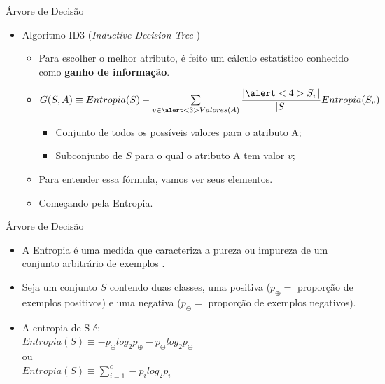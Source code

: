 \documentclass{libs/ufc_format}
\begin{document}
\begin{frame}{Árvore de Decisão}
    \begin{itemize}
        \item Algoritmo ID3 (\textit{Inductive Decision Tree} \cite{q86})
            \begin{itemize}
                \justifying
                \item Para escolher o melhor atributo, é feito um cálculo estatístico conhecido como \textbf{ganho de informação}.
                \item<2-> $G(S,A) \equiv Entropia(S) - \sum\limits_{v \in \alert<3>{Valores(A)}}\dfrac{|\alert<4>{S_{v}}|}{|S|}Entropia(S_{v})$
                    \begin{itemize}
                        \justifying
                        \item<3-4> Conjunto de todos os possíveis valores para o atributo A;
                        \item<4> Subconjunto de $S$ para o qual o atributo A tem valor $v$;
                    \end{itemize}
                \item<5-> Para entender essa fórmula, vamos ver seus elementos.
                \item<6> Começando pela Entropia.
            \end{itemize}
    \end{itemize}
\end{frame}

\begin{frame}{Árvore de Decisão}
    \begin{itemize}
        \justifying
        \item A Entropia é uma medida que caracteriza a pureza ou impureza de um conjunto arbitrário de exemplos \cite{m97}.
        \item<2-> Seja um conjunto $S$ contendo duas classes, uma positiva ($p_{\oplus} =$ proporção de exemplos positivos) e uma negativa ($p_{\ominus} =$ proporção de exemplos negativos).
        \item<3-> A entropia de S é:\\
        $Entropia(S) \equiv -p_{\oplus}log_{2}p_{\oplus} - p_{\ominus}log_{2}p_{\ominus}$\\
        ou\\
        $Entropia(S) \equiv \sum\limits_{i=1}^{c} - p^{}_{i}log^{}_{2}p^{}_{i}$
    \end{itemize}
\end{frame}
\end{document}
